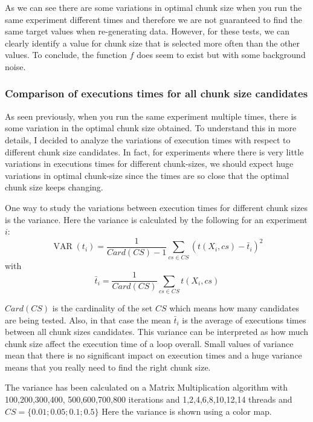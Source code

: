 \documentclass[12pt]{article}
\begin{document}
As we can see there are some variations in optimal chunk size when you run the same experiment different times and therefore we are not guaranteed to find the same target values when re-generating data. However, for these tests, we can clearly identify a value for chunk size that is selected more often than the other values. To conclude, the function $f$ does seem to exist but with some background noise.

\subsubsection{Comparison of executions times for all chunk size candidates}
As seen previously, when you run the same experiment multiple times, there is some variation in the optimal chunk size obtained. To understand this in more details, I decided to analyze the variations of execution times with respect to different chunk size candidates.
 In fact, for experiments where there is very little variations in executions times for different chunk-sizes, we should expect huge variations in optimal chunk-size since the times are so close that the optimal chunk size keeps changing.

One way to study the variations between execution times for different chunk sizes is the variance. Here the variance is calculated by the following for an experiment $i$:
$$\operatorname{VAR}(t_i)=\frac{1}{Card(CS)-1}\sum_{cs \in CS}(t(X_i,cs)-\bar{t}_i)^2$$
with 
$$\bar{t}_i=\frac{1}{Card(CS)}\sum_{cs \in CS}t(X_i,cs)$$

 $Card(CS)$ is the cardinality of the set $CS$ which means how many candidates are being tested. Also, in that case the mean $\bar{t}_i$ is the average of executions times between all chunk sizes candidates. This variance can be interpreted as how much chunk size affect the execution time of a loop overall. Small values of variance mean that there is no significant impact on execution times and a huge variance means that you really need to find the right chunk size.

The variance has been calculated on a Matrix Multiplication algorithm with 100,200,300,400, 500,600,700,800 iterations and 1,2,4,6,8,10,12,14 threads and $CS=\{0.01;0.05;0.1;0.5\}$
Here the variance is shown using a color map.
\end{document}
